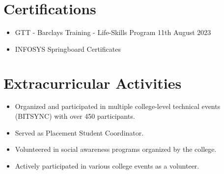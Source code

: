 \documentclass[11pt]{article}
\begin{document}
\section{Certifications}
\begin{itemize}
    \item GTT - Barclays Training - Life-Skills Program 11th August 2023
    \item INFOSYS Springboard Certificates
\end{itemize}
\section{Extracurricular Activities}
\begin{itemize}
    \item Organized and participated in multiple college-level technical events (BITSYNC) with over 450 participants.
    \item Served as Placement Student Coordinator.
    \item Volunteered in social awareness programs organized by the college.
    \item Actively participated in various college events as a volunteer.
\end{itemize}
\end{document}
